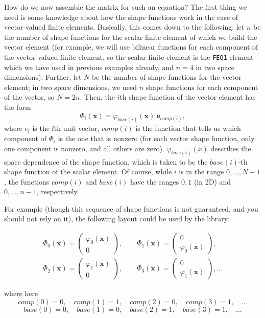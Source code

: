 \documentclass{article}
\renewcommand{\vec}[1]{{\mathbf #1}}
\begin{document}
How do we now assemble the matrix for such an equation? The first thing we
need is some knowledge about how the shape functions work in the case of
vector-valued finite elements. Basically, this comes down to the following:
let $n$ be the number of shape functions for the scalar finite element of
which we build the vector element (for example, we will use bilinear functions
for each component of the vector-valued finite element, so the scalar finite
element is the \texttt{FEQ1} element which we have used in previous examples
already, and $n=4$ in two space dimensions). Further, let $N$ be the number of
shape functions for the vector element; in two space dimensions, we need $n$
shape functions for each component of the vector, so $N=2n$. Then, the $i$th
shape function of the vector element has the form
$$
  \Phi_i(\vec x) = \varphi_{base(i)}(\vec x)\ \vec e_{comp(i)},
$$
where $e_l$ is the $l$th unit vector, $comp(i)$ is the function that tells
us which component of $\Phi_i$ is the one that is nonzero (for
each vector shape function, only one component is nonzero, and all others are
zero). $\varphi_{base(i)}(x)$ describes the space dependence of the shape
function, which is taken to be the $base(i)$-th shape function of the scalar
element. Of course, while $i$ is in the range $0,\ldots,N-1$, the functions
$comp(i)$ and $base(i)$ have the ranges $0,1$ (in 2D) and $0,\ldots,n-1$,
respectively. 

For example (though this sequence of shape functions is not
guaranteed, and you should not rely on it),
the following layout could be used by the library:
\begin{center}
\begin{multline*}
  \Phi_0(\vec x) = 
  \begin{pmatrix}
    \varphi_0(\vec x) \\ 0
  \end{pmatrix},
  \qquad
  \Phi_1(\vec x) = 
  \begin{pmatrix}
    0 \\ \varphi_0(\vec x)
  \end{pmatrix},
  \\
  \Phi_2(\vec x) = 
  \begin{pmatrix}
    \varphi_1(\vec x) \\ 0
  \end{pmatrix},
  \qquad
  \Phi_3(\vec x) = 
  \begin{pmatrix}
    0 \\ \varphi_1(\vec x)
  \end{pmatrix},
  \ldots
\end{multline*}
\end{center}
where here
$$
  comp(0)=0, \quad  comp(1)=1, \quad  comp(2)=0, \quad  comp(3)=1, \quad  \ldots
$$
$$
  base(0)=0, \quad  base(1)=0, \quad  base(2)=1, \quad  base(3)=1, \quad  \ldots
$$
\end{document}
